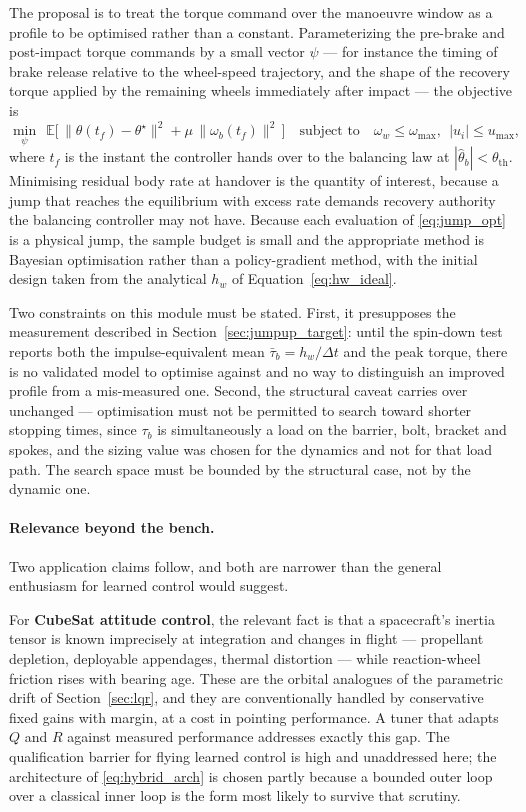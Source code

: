 The proposal is to treat the torque command over the manoeuvre window as a
profile to be optimised rather than a constant. Parameterizing the
pre-brake and post-impact torque commands by a small vector $\psi$ --- for
instance the timing of brake release relative to the wheel-speed trajectory,
and the shape of the recovery torque applied by the remaining wheels
immediately after impact --- the objective is
\begin{equation}
\min_{\psi}\ \ \mathbb{E}\Big[\, \|\theta(t_f) - \theta^\star\|^2 + \mu\,\|\omega_b(t_f)\|^2 \,\Big]
\quad \text{subject to} \quad
\omega_w \le \omega_{\max},\ \ |u_i| \le u_{\max},
\label{eq:jump_opt}
\end{equation}
where $t_f$ is the instant the controller hands over to the balancing law at
$|\hat\theta_b| < \theta_{\text{th}}$. Minimising residual body rate at
handover is the quantity of interest, because a jump that reaches the
equilibrium with excess rate demands recovery authority the balancing
controller may not have. Because each evaluation of \eqref{eq:jump_opt} is a
physical jump, the sample budget is small and the appropriate method is
Bayesian optimisation rather than a policy-gradient method, with the initial
design taken from the analytical $h_w$ of Equation~\eqref{eq:hw_ideal}.

Two constraints on this module must be stated. First, it presupposes the
measurement described in Section~\ref{sec:jumpup_target}: until the spin-down
test reports both the impulse-equivalent mean
$\bar\tau_b = h_w/\Delta t$ and the peak torque, there is no validated model to
optimise against and no way to distinguish an improved profile from a
mis-measured one. Second, the structural caveat carries over unchanged ---
optimisation must not be permitted to search toward shorter stopping times,
since $\tau_b$ is simultaneously a load on the barrier, bolt, bracket and
spokes, and the sizing value was chosen for the dynamics and not for that load
path. The search space must be bounded by the structural case, not by the
dynamic one.

\paragraph{Relevance beyond the bench.} Two application claims follow, and both are narrower than the general
enthusiasm for learned control would suggest.

For \textbf{CubeSat attitude control}, the relevant fact is that a
spacecraft's inertia tensor is known imprecisely at integration and changes in
flight --- propellant depletion, deployable appendages, thermal distortion ---
while reaction-wheel friction rises with bearing age. These are the orbital
analogues of the parametric drift of Section~\ref{sec:lqr}, and they are
conventionally handled by conservative fixed gains with margin, at a cost in
pointing performance. A tuner that adapts $Q$ and $R$ against measured
performance addresses exactly this gap. The qualification barrier for flying
learned control is high and unaddressed here; the architecture of
\eqref{eq:hybrid_arch} is chosen partly because a bounded outer loop over a
classical inner loop is the form most likely to survive that scrutiny.

